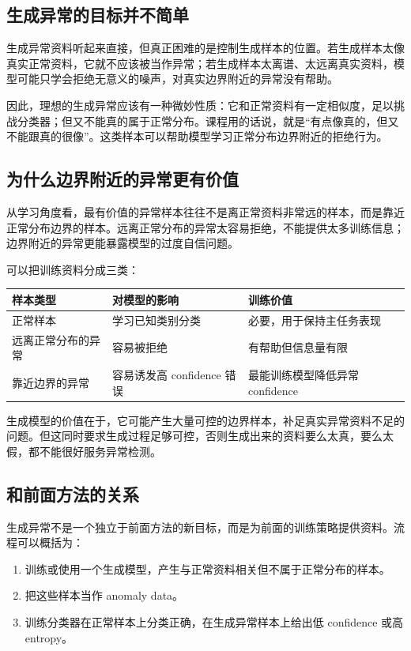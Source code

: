 \documentclass[a4paper]{article}
\begin{document}
\subsection{生成异常的目标并不简单}

生成异常资料听起来直接，但真正困难的是控制生成样本的位置。若生成样本太像真实正常资料，它就不应该被当作异常；若生成样本太离谱、太远离真实资料，模型可能只学会拒绝无意义的噪声，对真实边界附近的异常没有帮助。

因此，理想的生成异常应该有一种微妙性质：它和正常资料有一定相似度，足以挑战分类器；但又不能真的属于正常分布。课程用的话说，就是“有点像真的，但又不能跟真的很像”。这类样本可以帮助模型学习正常分布边界附近的拒绝行为。

\subsection{为什么边界附近的异常更有价值}

从学习角度看，最有价值的异常样本往往不是离正常资料非常远的样本，而是靠近正常分布边界的样本。远离正常分布的异常太容易拒绝，不能提供太多训练信息；边界附近的异常更能暴露模型的过度自信问题。

可以把训练资料分成三类：
\begin{center}
\begin{tabular}{L{3.4cm} L{4.8cm} L{4.8cm}}
\toprule
样本类型 & 对模型的影响 & 训练价值 \\
\midrule
正常样本 & 学习已知类别分类 & 必要，用于保持主任务表现 \\
远离正常分布的异常 & 容易被拒绝 & 有帮助但信息量有限 \\
靠近边界的异常 & 容易诱发高 confidence 错误 & 最能训练模型降低异常 confidence \\
\bottomrule
\end{tabular}
\end{center}

生成模型的价值在于，它可能产生大量可控的边界样本，补足真实异常资料不足的问题。但这同时要求生成过程足够可控，否则生成出来的资料要么太真，要么太假，都不能很好服务异常检测。

\subsection{和前面方法的关系}

生成异常不是一个独立于前面方法的新目标，而是为前面的训练策略提供资料。流程可以概括为：
\begin{enumerate}
    \item 训练或使用一个生成模型，产生与正常资料相关但不属于正常分布的样本。
    \item 把这些样本当作 anomaly data。
    \item 训练分类器在正常样本上分类正确，在生成异常样本上给出低 confidence 或高 entropy。
\end{enumerate}
\end{document}
